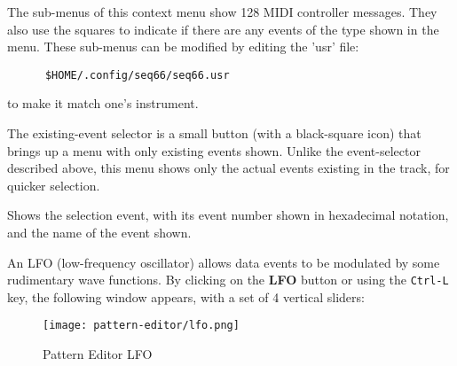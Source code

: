    The sub-menus of this context menu show 128 MIDI controller messages.
   They also use the squares to
   indicate if there are any events of the type shown in the menu.
   These sub-menus can be modified by editing the 'usr' file:
   
   \begin{verbatim}
      $HOME/.config/seq66/seq66.usr
   \end{verbatim}

   to make it match one's instrument.

   The existing-event selector is a small button (with a black-square icon)
   that brings up a menu with only existing events shown.
   Unlike the event-selector described above, this menu
   shows only the actual events existing in the track, for quicker selection.

   Shows the selection event, with its event number shown in hexadecimal
   notation, and the name of the event shown.

   An LFO (low-frequency oscillator) allows data events
   to be modulated by some rudimentary wave functions.
   By clicking on the \textbf{LFO} button or using the \texttt{Ctrl-L} key,
   the following window appears, with a set of 4 vertical sliders:

\begin{figure}[H]
   \centering 
  \texttt{[image: pattern-editor/lfo.png]}
   \caption{Pattern Editor LFO}
   \label{fig:pattern_editor_bottom_lfo}
\end{figure}

